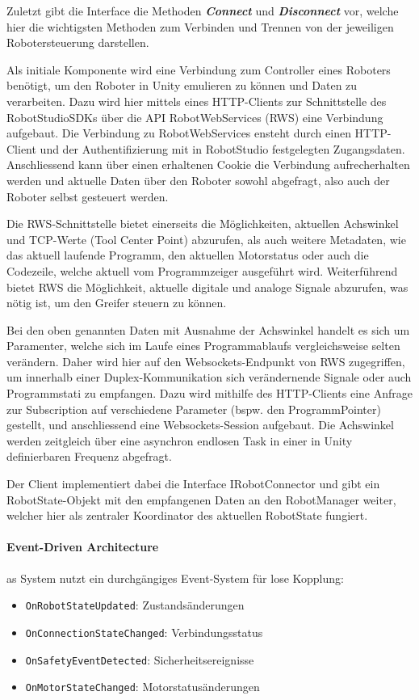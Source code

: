 Zuletzt gibt die Interface die Methoden \textit{\textbf{Connect}} und
\textit{\textbf{Disconnect}}
vor, welche hier die wichtigsten Methoden zum Verbinden und
Trennen von der jeweiligen Robotersteuerung darstellen.

Als initiale Komponente wird eine Verbindung zum
Controller eines Roboters benötigt, um den Roboter in Unity emulieren zu können
und Daten zu verarbeiten. Dazu wird hier mittels eines HTTP-Clients zur
Schnittstelle des RobotStudioSDKs über die API RobotWebServices (RWS) eine
Verbindung aufgebaut. Die Verbindung zu RobotWebServices ensteht durch einen
HTTP-Client und der Authentifizierung mit in RobotStudio festgelegten
Zugangsdaten. Anschliessend kann über einen erhaltenen Cookie die Verbindung
aufrecherhalten werden und aktuelle Daten über den Roboter sowohl abgefragt,
also auch der Roboter selbst gesteuert werden.

Die RWS-Schnittstelle bietet einerseits die Möglichkeiten,
aktuellen Achswinkel und TCP-Werte (Tool Center Point) abzurufen, als auch
weitere Metadaten, wie das aktuell laufende Programm, den aktuellen Motorstatus
oder auch die Codezeile, welche aktuell vom Programmzeiger ausgeführt wird.
Weiterführend bietet RWS die Möglichkeit, aktuelle digitale und analoge
Signale abzurufen, was nötig ist, um den Greifer steuern zu können.

Bei den oben genannten Daten mit Ausnahme der Achswinkel handelt es sich um
Paramenter, welche sich im Laufe eines Programmablaufs vergleichsweise selten
verändern. Daher wird hier auf den Websockets-Endpunkt von RWS zugegriffen, um
innerhalb einer Duplex-Kommunikation sich verändernende Signale oder auch
Programmstati zu empfangen. Dazu wird mithilfe des HTTP-Clients eine Anfrage zur
Subscription auf verschiedene Parameter (bspw. den ProgrammPointer) gestellt,
und anschliessend eine Websockets-Session aufgebaut. Die Achswinkel werden
zeitgleich über eine asynchron endlosen Task in einer in Unity definierbaren
Frequenz abgefragt.

Der Client implementiert dabei die Interface IRobotConnector und gibt ein
RobotState-Objekt mit den empfangenen Daten an den RobotManager
weiter, welcher hier
als zentraler Koordinator des aktuellen RobotState fungiert.

\paragraph{Event-Driven Architecture}
as System nutzt ein durchgängiges Event-System für lose Kopplung:
\begin{itemize}
  \item \texttt{OnRobotStateUpdated}: Zustandsänderungen
  \item \texttt{OnConnectionStateChanged}: Verbindungsstatus
  \item \texttt{OnSafetyEventDetected}: Sicherheitsereignisse
  \item \texttt{OnMotorStateChanged}: Motorstatusänderungen
\end{itemize}

